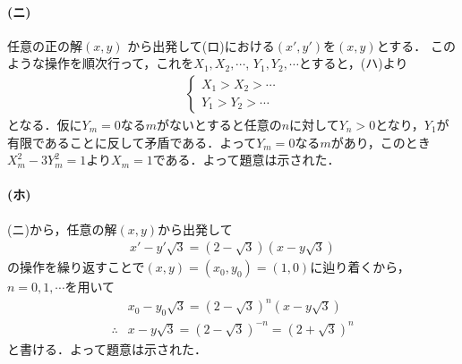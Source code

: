 \documentclass[../../main.tex]{subfiles}
\begin{document}
\paragraph{(ニ)}

任意の正の解$(x,y)$ から出発して(ロ)における$(x',y')$を$(x,y)$とする．
このような操作を順次行って，これを$X_1,X_2,\cdots$, $Y_1,Y_2,\cdots$とすると，(ハ)より
\begin{align}
  \begin{cases}
    X_1 > X_2 > \cdots  \\
    Y_1 > Y_2 > \cdots
  \end{cases}
\end{align}
となる．仮に$Y_m=0$なる$m$がないとすると任意の$n$に対して$Y_n>0$となり，$Y_1$が有限であることに反して矛盾である．よって$Y_m=0$なる$m$があり，このとき$X_m^2-3Y_m^2=1$より$X_m=1$である．よって題意は示された．

\paragraph{(ホ)}

(ニ)から，任意の解$(x,y)$から出発して
\begin{align}
  x'-y'\sqrt{3} = (2-\sqrt{3})(x-y\sqrt{3})
\end{align}
の操作を繰り返すことで$(x,y)=(x_0,y_0)=(1,0)$に辿り着くから，$n=0,1,\cdots$を用いて
\begin{align}
  & x_0 - y_0\sqrt{3} = (2-\sqrt{3})^n(x-y\sqrt{3}) \\
  \therefore
  & x-y\sqrt{3} = (2-\sqrt{3})^{-n} = (2+\sqrt{3})^{n}
\end{align}
と書ける．よって題意は示された．

\newpage
\end{document}
